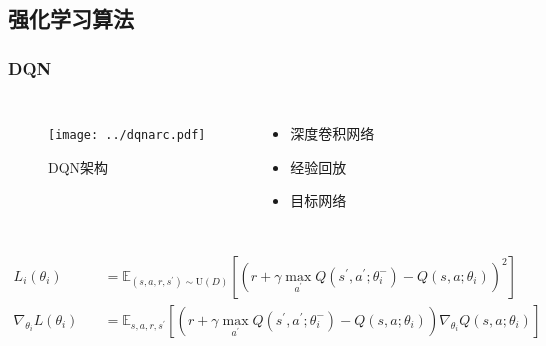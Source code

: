 \documentclass{beamer}
\begin{document}
\begin{CJK*}{GBK}{hei}
\section{强化学习算法}
\begin{frame}\frametitle{DQN}
        \begin{columns}
            \begin{figure}[htbp]
                \centering\texttt{[image: ../dqnarc.pdf]}
    	    \caption{DQN架构\citep{Mnih2015HumanlevelCT}}
            \end{figure}
            \begin{itemize}
                \item 深度卷积网络
                \item 经验回放
                \item 目标网络
            \end{itemize}
        \end{columns}
        {\small{
            \begin{align*}
                L_{i}\left(\theta_{i}\right)&=\mathbb{E}_{\left(s, a, r, s^{\prime}\right) \sim \mathrm{U}(D)}\left[\left(r+\gamma \max _{a^{\prime}} Q\left(s^{\prime}, a^{\prime} ; \theta_{i}^{-}\right)-Q\left(s, a ; \theta_{i}\right)\right)^{2}\right]\\
                \nabla_{\theta_{i}} L\left(\theta_{i}\right) \quad&=\mathbb{E}_{s, a, r, s^{\prime}}\left[\left(r+\gamma \max _{a^{\prime}} Q\left(s^{\prime}, a^{\prime} ; \theta_{i}^{-}\right)-Q\left(s, a ; \theta_{i}\right)\right) \nabla_{\theta_{i}} Q\left(s, a ; \theta_{i}\right)\right]
            \end{align*}
        }}
\end{frame}


\end{CJK*}
\end{document}
